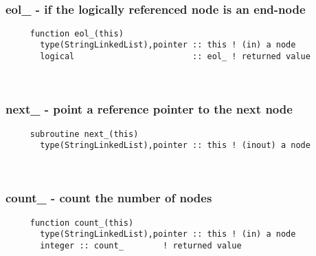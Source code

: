  
\mbox{}\hrulefill\ 
 
  \subsubsection{eol\_ - if the logically referenced node is an end-node}

\begin{verbatim} 
     function eol_(this)
       type(StringLinkedList),pointer :: this ! (in) a node
       logical                        :: eol_ ! returned value
 \end{verbatim}%
 
 
\mbox{}\hrulefill\ 
 
  \subsubsection{next\_ - point a reference pointer to the next node}

\begin{verbatim} 
     subroutine next_(this)
       type(StringLinkedList),pointer :: this ! (inout) a node
 \end{verbatim}%
 
 
\mbox{}\hrulefill\ 
 

  \subsubsection{count\_ - count the number of nodes}

\begin{verbatim} 
     function count_(this)
       type(StringLinkedList),pointer :: this ! (in) a node
       integer :: count_		! returned value
 \end{verbatim}%
 
